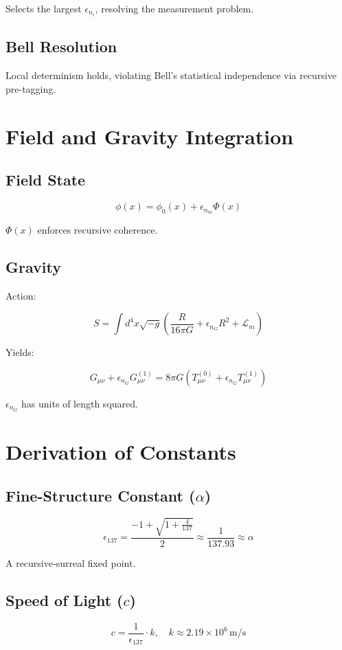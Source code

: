 \documentclass[12pt]{article}
\begin{document}
Selects the largest \(\epsilon_{n_i}\), resolving the measurement problem.

\subsection{Bell Resolution}
Local determinism holds, violating Bell's statistical independence via recursive pre-tagging.

\section{Field and Gravity Integration}

\subsection{Field State}
\[
\phi(x) = \phi_0(x) + \epsilon_{n_m} \Phi(x)
\]

\(\Phi(x)\) enforces recursive coherence.

\subsection{Gravity}
Action:

\[
S = \int d^4x \sqrt{-g} \left( \frac{R}{16\pi G} + \epsilon_{n_G} R^2 + \mathcal{L}_m \right)
\]

Yields:

\[
G_{\mu\nu} + \epsilon_{n_G} G_{\mu\nu}^{(1)} = 8\pi G (T_{\mu\nu}^{(0)} + \epsilon_{n_G} T_{\mu\nu}^{(1)})
\]

\(\epsilon_{n_G}\) has units of length squared.

\section{Derivation of Constants}

\subsection{Fine-Structure Constant (\(\alpha\))}
\[
\epsilon_{137} = \frac{-1 + \sqrt{1 + \frac{4}{137}}}{2} \approx \frac{1}{137.93} \approx \alpha
\]

A recursive-surreal fixed point.

\subsection{Speed of Light (\(c\))}
\[
c = \frac{1}{\epsilon_{137}} \cdot k, \quad k \approx 2.19 \times 10^6 \, \text{m/s}
\]
\end{document}
